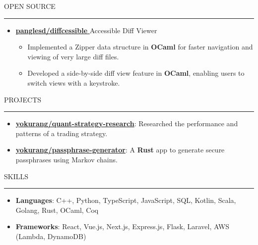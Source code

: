 \documentclass[letterpaper, 11pt]{article}
\def\sectionlineskip{\medskip}
\def\sectionskip{\medskip}
\def \entryspacing {-0pt}
\newcommand{\SectionHeading}[1]{
  \sectionskip
  \raggedright\raggedbottom\MakeUppercase{\large{#1}}
  \sectionlineskip
  \hrule
  \color{black}
}
\newcommand{\ResumeItem}[2]{
  \item{
    \textbf{#1}{: #2 \vspace{-2.835pt}}
  }
}
\newcommand{\ResumeItemDefault}[1]{
  \item{
    #1 \vspace{-2.835pt}
  }
}
\newcommand{\ResumeProjectItem}[3]{
  \item{
    \href{#2}{\textbf{#1}}{: #3 \vspace{-2.835pt}}
  }
}
\newcommand{\ResumeEntryStart}{\begin{itemize}[leftmargin=0mm, label={}]}
\newcommand{\ResumeEntryEnd}{\end{itemize}\vspace{-2.835pt}} %
\newcommand{\ResumeItemListStart}{\begin{itemize}[leftmargin=5mm, label=$\bullet$, itemsep=1mm, parsep=1mm]} %
\newcommand{\ResumeItemListEnd}{\end{itemize}}
\newcommand{\ProjectItemListStart}{\begin{itemize}[leftmargin=*, label=$\bullet$]}
\newcommand{\ProjectItemListEnd}{\end{itemize}\vspace{\entryspacing}}
\newcommand{\OpenSourceProjectItem}[3]{
  \item{
    \href{#1}{\textbf{#2} }\hfill{#3}\vspace{-2.835pt}
  }
}
\begin{document}
  \SectionHeading{Open Source}
  \ResumeEntryStart
    \OpenSourceProjectItem{https://github.com/panglesd/diffcessible}{panglesd/diffcessible}{Accessible Diff Viewer}
    \ResumeItemListStart
        \ResumeItemDefault{Implemented a Zipper data structure in \textbf{OCaml} for faster navigation and viewing of very large diff files.}
        \ResumeItemDefault{Developed a side-by-side diff view feature in \textbf{OCaml}, enabling users to switch views with a keystroke.}
    \ResumeItemListEnd
  \ResumeEntryEnd

  \SectionHeading{Projects}
  \ProjectItemListStart
    \ResumeProjectItem{yokurang/quant-strategy-research}
    {https://github.com/yokurang/quant-strategy-research}
    {Researched the performance and patterns of a trading strategy.}
    \ResumeProjectItem{yokurang/passphrase-generator}
    {https://github.com/yokurang/passphrase-generator}
    {A \textbf{Rust} app to generate secure passphrases using Markov chains.}

  \ProjectItemListEnd

  \SectionHeading{Skills}
  \ResumeEntryStart
    \ResumeItem{Languages}{ C++, Python, TypeScript, JavaScript, SQL, Kotlin, Scala, Golang, Rust, OCaml, Coq }
    \ResumeItem{Frameworks}{ React, Vue.js, Next.js, Express.js, Flask, Laravel, AWS (Lambda, DynamoDB) }
  \ResumeEntryEnd
\end{document}
